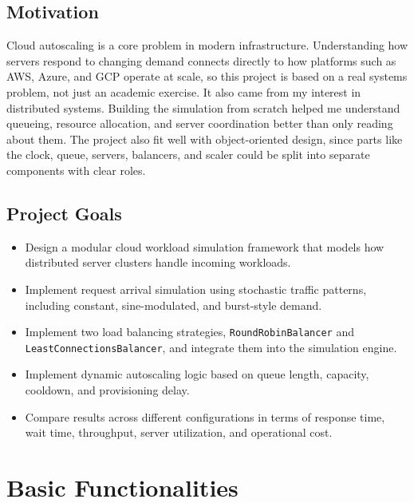 \documentclass[12pt, a4paper]{article}
\newcommand{\code}[1]{\texttt{\textcolor{NUNavyL}{#1}}}
\begin{document}
\subsection{Motivation}

Cloud autoscaling is a core problem in modern infrastructure.
Understanding how servers respond to changing demand connects directly to how
platforms such as AWS, Azure, and GCP operate at scale, so this project is
based on a real systems problem, not just an academic exercise.
It also came from my interest in distributed systems.
Building the simulation from scratch helped me understand queueing,
resource allocation, and server coordination better than only reading about them.
The project also fit well with object-oriented design, since parts like the
clock, queue, servers, balancers, and scaler could be split into separate
components with clear roles.

\subsection{Project Goals}

\begin{itemize}[leftmargin=1.5em, label=\textcolor{NURed}{\faCheckCircle}]
  \item Design a modular cloud workload simulation framework that models how
    distributed server clusters handle incoming workloads.
  \item Implement request arrival simulation using stochastic traffic patterns,
    including constant, sine-modulated, and burst-style demand.
  \item Implement two load balancing strategies, \code{RoundRobinBalancer} and
    \code{LeastConnectionsBalancer}, and integrate them into the simulation engine.
  \item Implement dynamic autoscaling logic based on queue length, capacity,
    cooldown, and provisioning delay.
  \item Compare results across different configurations in terms of response
    time, wait time, throughput, server utilization, and operational cost.
\end{itemize}

\section{Basic Functionalities}
\end{document}

